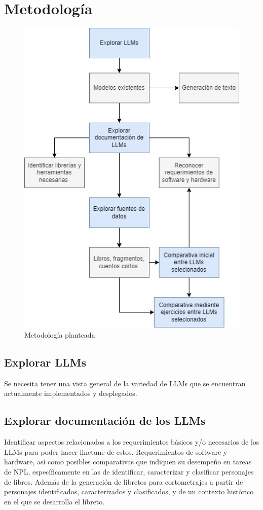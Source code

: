 \documentclass[journal,onecolumn]{IEEEtran}
\begin{document}
	\section{Metodología}
		\begin{figure}[H]
		\centering
		\includegraphics[scale=0.5]{metodologia}
		\caption{Metodología planteada}
		\small
	\end{figure}
	\subsection{Explorar LLMs}
	Se necesita tener una vista general de la variedad de LLMs que se encuentran actualmente implementados y desplegados.
	\subsection{Explorar documentación de los LLMs}
	Identificar aspectos relacionados a los requerimientos básicos y/o necesarios de los LLMs para poder hacer finetune de estos. Requerimientos de software y hardware, así como posibles comparativas que indiquen su desempeño en tareas de NPL, específicamente en las de identificar, caracterizar y clasificar personajes de libros. Además de la generación de libretos para cortometrajes a partir de personajes identificados, caracterizados y clasificados, y de un contexto histórico en el que se desarrolla el libreto.
\end{document}
